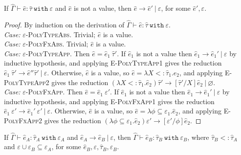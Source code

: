 \documentclass{llncs}
\newcommand{\keywadj}[1]{\mathtt{#1}}
\newcommand{\keyw}[1]{\keywadj{#1}~}
\newcommand{\kw}[1]{\keyw{ #1 }}
\begin{document}
\hrulefill


\begin{theorem}[Progress]
If $\hat \Gamma \vdash \hat e: \hat \tau~\kw{with} \varepsilon$ and $\hat e$ is not a value, then $\hat e \longrightarrow \hat e'~|~\varepsilon$, for some $\hat e', \varepsilon$.
\end{theorem}

\begin{proof} By induction on the derivation of $\hat \Gamma \vdash \hat e: \hat \tau~\kw{with} \varepsilon$.\\

\textit{Case:} \textsc{$\varepsilon$-PolyTypeAbs}. Trivial; $\hat e$ is a value. \\

\textit{Case:} \textsc{$\varepsilon$-PolyFxAbs}. Trivial; $\hat e$ is a value. \\

\textit{Case:} \textsc{$\varepsilon$-PolyTypeApp}. Then $\hat e= \hat e_1~\hat \tau'$. If $\hat e_1$ is not a value then $\hat e_1 \longrightarrow \hat e_1'~|~\varepsilon$ by inductive hypothesis, and applying \textsc{E-PolyTypeApp1} gives the reduction $\hat e_1~\hat \tau' \longrightarrow \hat e'' \hat \tau'~|~\varepsilon$. Otherwise, $\hat e$ is a value, so $\hat e = \lambda X <: \hat \tau_1. \hat e_2$, and applying \textsc{E-PolyTypeApp2} gives the reduction $(\lambda X <: \hat \tau_1. \hat e_2) \hat \tau' \longrightarrow [\hat \tau'/X]\hat e_2~|~\varnothing$. \\

\textit{Case:} \textsc{$\varepsilon$-PolyFxApp}. Then $\hat e = \hat e_1~\varepsilon'$. If $\hat e_1$ is not a value then $\hat e_1 \longrightarrow \hat e_1'~|~\varepsilon$ by inductive hypothesis, and applying \textsc{E-PolyFxApp1} gives the reduction $\hat e_1~\varepsilon' \longrightarrow \hat e_1'~\varepsilon'~|~\varepsilon$. Otherwise, $\hat e$ is a value, so $\hat e = \lambda \phi \subseteq \varepsilon_1.\hat e_2$, and applying \textsc{E-PolyFxApp2} gives the reduction $(\lambda \phi \subseteq \varepsilon_1.\hat e_2) \varepsilon' \longrightarrow [\varepsilon'/\phi]\hat e_2$.


\end{proof}


\hrulefill

\begin{theorem} [Preservation]
If $\hat \Gamma \vdash \hat e_A: \hat \tau_A~\kw{with} \varepsilon_A$ and $\hat e_A \longrightarrow \hat e_B~|~\varepsilon$, then $\hat \Gamma \vdash \hat e_B: \hat \tau_B~\kw{with} \varepsilon_B$, where $\hat \tau_B <: \hat \tau_A$ and $\varepsilon \cup \varepsilon_B \subseteq \varepsilon_A$, for some $\hat e_B, \varepsilon, \hat \tau_B, \varepsilon_B$.
\end{theorem}
\end{document}
